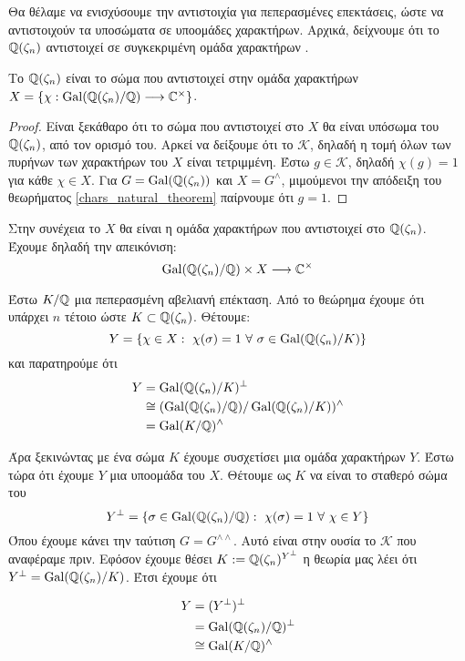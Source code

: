 \noindent Θα θέλαμε να ενισχύσουμε την αντιστοιχία  για πεπερασμένες επεκτάσεις, ώστε να αντιστοιχούν τα υποσώματα σε υποομάδες χαρακτήρων. 
Αρχικά, δείχνουμε ότι το $\mathbb{Q}(\zeta_n)$ αντιστοιχεί σε συγκεκριμένη ομάδα χαρακτήρων .

\begin{prop}
	Το $\mathbb{Q}(\zeta_n)$ είναι το σώμα που αντιστοιχεί στην ομάδα χαρακτήρων $X= \{\chi: \operatorname{Gal}(\mathbb{Q}(\zeta_n)/\mathbb{Q}) \longrightarrow \mathbb{C}^\times\}$.
\end{prop}

\begin{proof}
	Είναι ξεκάθαρο ότι το σώμα που αντιστοιχεί στο $X$ θα είναι υπόσωμα του $\mathbb{Q}(\zeta_n)$, από τον ορισμό του. Αρκεί να δείξουμε ότι το $\mathcal{K}$, 
	δηλαδή η τομή όλων των πυρήνων των χαρακτήρων του $X$ είναι τετριμμένη. Έστω $g \in \mathcal{K}$, δηλαδή $\chi(g) =1 $ για κάθε $\chi \in X$. 
	Για $G=\operatorname{Gal}(\mathbb{Q}(\zeta_n))$ και $X= G^{\wedge}$, μιμούμενοι την απόδειξη του θεωρήματος \ref{chars_natural_theorem} παίρνουμε ότι $g=1$.
\end{proof}

\noindent Στην συνέχεια το $X$ θα είναι η ομάδα χαρακτήρων που αντιστοιχεί στο $\mathbb{Q}(\zeta_n)$. Έχουμε δηλαδή την  απεικόνιση:
$$\operatorname{Gal}(\mathbb{Q}(\zeta_n)/\mathbb{Q}) \times X \longrightarrow \mathbb{C}^\times$$

\noindent Έστω $K/\mathbb{Q}$ μια πεπερασμένη αβελιανή επέκταση. Από το θεώρημα  έχουμε ότι υπάρχει $n$ τέτοιο ώστε $K\subset \mathbb{Q}(\zeta_n)$. 
Θέτουμε:
$$Y = \{\chi \in X: \ \chi(\sigma)= 1 \ \forall \ \sigma \in \operatorname{Gal}(\mathbb{Q}(\zeta_n)/K)\}$$ και παρατηρούμε ότι
\begin{align*}
	Y &= \operatorname{Gal}(\mathbb{Q}(\zeta_n)/K)^{\perp} \\
	&\cong (\operatorname{Gal}(\mathbb{Q}(\zeta_n)/\mathbb{Q})/\operatorname{Gal}(\mathbb{Q}(\zeta_n)/K))^{\wedge} \\
	&=\operatorname{Gal}(K/\mathbb{Q})^{\wedge}
\end{align*}

\noindent Άρα ξεκινώντας με ένα σώμα $K$ έχουμε συσχετίσει μια ομάδα χαρακτήρων  $Y$. Έστω τώρα ότι έχουμε $Y$ μια υποομάδα του $X$. 
Θέτουμε ως $K$ να είναι το σταθερό σώμα του
$$Y^{\perp} = \{\sigma \in \operatorname{Gal}(\mathbb{Q}(\zeta_n)/\mathbb{Q}): \ \chi(\sigma) =1 \ \forall \ \chi \in Y\}$$
Όπου έχουμε κάνει την ταύτιση $G=G^{\wedge\wedge}$. Αυτό είναι στην ουσία το $\mathcal{K}$ που αναφέραμε πριν. Εφόσον έχουμε θέσει 
$K:=\mathbb{Q}(\zeta_n)^{Y^{\perp}}$ η θεωρία  μας λέει ότι $Y^{\perp} = \operatorname{Gal}(\mathbb{Q}(\zeta_n)/K)$. Έτσι έχουμε ότι

\begin{align*}
	Y&=(Y^{\perp})^{\perp} \\
	&=\operatorname{Gal}(\mathbb{Q}(\zeta_n)/\mathbb{Q})^{\perp} \\
	&\cong \operatorname{Gal}(K/\mathbb{Q})^{\wedge}
\end{align*}

